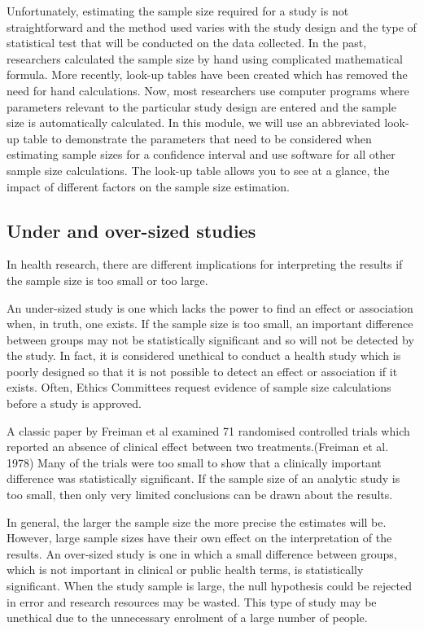 \documentclass[
  a4paper,
]{memoir}
\begin{document}
Unfortunately, estimating the sample size required for a study is not
straightforward and the method used varies with the study design and the
type of statistical test that will be conducted on the data collected.
In the past, researchers calculated the sample size by hand using
complicated mathematical formula. More recently, look-up tables have
been created which has removed the need for hand calculations. Now, most
researchers use computer programs where parameters relevant to the
particular study design are entered and the sample size is automatically
calculated. In this module, we will use an abbreviated look-up table to
demonstrate the parameters that need to be considered when estimating
sample sizes for a confidence interval and use software for all other
sample size calculations. The look-up table allows you to see at a
glance, the impact of different factors on the sample size estimation.

\subsection{Under and over-sized
studies}\label{under-and-over-sized-studies}

In health research, there are different implications for interpreting
the results if the sample size is too small or too large.

An under-sized study is one which lacks the power to find an effect or
association when, in truth, one exists. If the sample size is too small,
an important difference between groups may not be statistically
significant and so will not be detected by the study. In fact, it is
considered unethical to conduct a health study which is poorly designed
so that it is not possible to detect an effect or association if it
exists. Often, Ethics Committees request evidence of sample size
calculations before a study is approved.

A classic paper by Freiman et al examined 71 randomised controlled
trials which reported an absence of clinical effect between two
treatments.(Freiman et al. 1978) Many of the trials were too small to
show that a clinically important difference was statistically
significant. If the sample size of an analytic study is too small, then
only very limited conclusions can be drawn about the results.

In general, the larger the sample size the more precise the estimates
will be. However, large sample sizes have their own effect on the
interpretation of the results. An over-sized study is one in which a
small difference between groups, which is not important in clinical or
public health terms, is statistically significant. When the study sample
is large, the null hypothesis could be rejected in error and research
resources may be wasted. This type of study may be unethical due to the
unnecessary enrolment of a large number of people.
\end{document}
